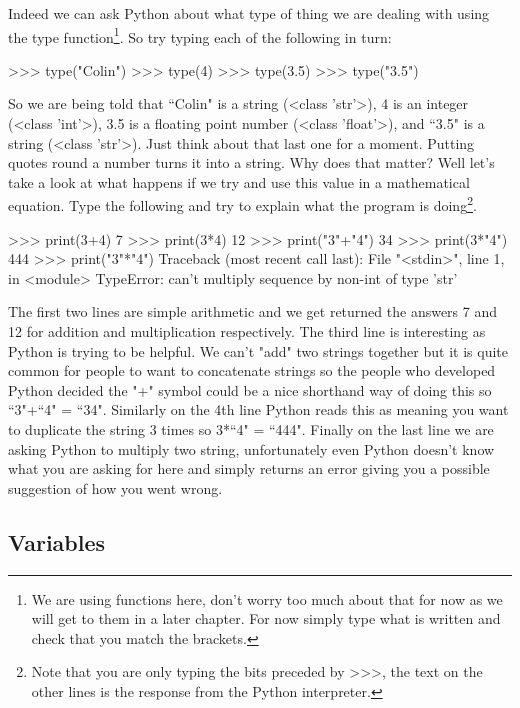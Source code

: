 Indeed we can ask Python about what type of thing we are dealing with using the type function\footnote{We are using functions here, don't worry too much about that for now as we will get to them in a later chapter. For now simply type what is written and check that you match the brackets.}. So try typing each of the following in turn:

\begin{python}[]
>>> type("Colin")
>>> type(4)
>>> type(3.5)
>>> type("3.5")
\end{python}


So we are being told that ``Colin" is a string (<class 'str'>), 4 is an integer (<class 'int'>), 3.5 is a floating point number (<class 'float'>), and ``3.5" is a string (<class 'str'>). Just think about that last one for a moment. Putting quotes round a number turns it into a string. Why does that matter? Well let's take a look at what happens if we try and use this value in a mathematical equation. Type the following and try to explain what the program is doing\footnote{Note that you are only typing the bits preceded by >>>, the text on the other lines is the response from the Python interpreter.}.

\begin{python}
>>> print(3+4)
7
>>> print(3*4)
12
>>> print("3"+"4")
34
>>> print(3*"4")
444
>>> print("3"*"4")
Traceback (most recent call last):
  File "<stdin>", line 1, in <module>
TypeError: can't multiply sequence by non-int of type 'str'
\end{python}

The first two lines are simple arithmetic and we get returned the answers 7 and 12 for addition and multiplication respectively. The third line is interesting as Python is trying to be helpful. We can't "add" two strings together but it is quite common for people to want to concatenate strings so the people who developed Python decided the "+" symbol could be a nice shorthand way of doing this so ``3"+``4" = ``34". Similarly on the 4th line Python reads this as meaning you want to duplicate the string 3 times so 3*``4" = ``444". Finally on the last line we are asking Python to multiply two string, unfortunately even Python doesn't know what you are asking for here and simply returns an error giving you a possible suggestion of how you went wrong.

\subsection{Variables}

